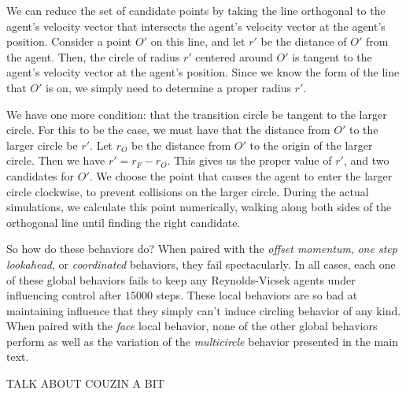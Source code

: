 We can reduce the set of candidate points by taking the line orthogonal to the
agent's velocity vector that intersects the agent's velocity vector at the
agent's position.
Consider a point $O'$ on this line, and let $r'$ be the distance of
$O'$ from the agent.
Then, the circle of radius $r'$ centered around $O'$ is tangent to
the agent's velocity vector at the agent's position.
Since we know the form of the line that $O'$ is on, we simply need to
determine a proper radius $r'$.

We have one more condition: that the transition circle be tangent to the larger
circle.
For this to be the case, we must have that the distance from $O'$ to the
larger circle be $r'$.
Let $r_{O}$ be the distance from $O'$ to the origin of the larger circle.
Then we have $r' = r_F - r_{O}$.
This gives us the proper value of $r'$, and two candidates for $O'$.
We choose the point that causes the agent to enter the larger circle clockwise,
to prevent collisions on the larger circle.
During the actual simulations, we calculate this point numerically, walking
along both sides of the orthogonal line until finding the right candidate.

So how do these behaviors do?
When paired with the \textit{offset momentum}, \textit{one step lookahead}, or
\textit{coordinated} behaviors, they fail spectacularly.
In all cases, each one of these global behaviors fails to keep any
Reynolds-Vicsek agents under influencing control after $15000$ steps.
These local behaviors are so bad at maintaining influence that they simply
can't induce circling behavior of any kind.
When paired with the \textit{face} local behavior, none of the other global
behaviors perform as well as the variation of the \textit{multicircle} behavior
presented in the main text.

TALK ABOUT COUZIN A BIT 
